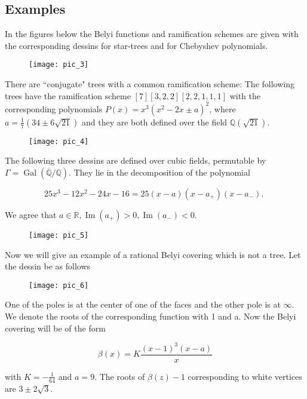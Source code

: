 \subsection{Examples}

\begin{example}
   In the figures below the Belyi functions and ramification schemes are given with the corresponding dessins for star-trees and for Chebyshev polynomials. 
\begin{figure}[htp]
\texttt{[image: pic\_3]}
\end{figure}
\end{example}


\begin{example}
There are ``conjugate" trees with a common ramification scheme: The following trees have the ramification scheme $[7][3,2,2][2,2,1,1,1]$ with the corresponding polynomials $P(x)=x^{3}\left(x^{2}-2 x \pm a\right)^{2}$, where $a=\frac{1}{7}(34 \pm 6 \sqrt{21})$ and they are both defined over the field $\mathbb{Q}(\sqrt{21})$.
\begin{figure}[htp]
\texttt{[image: pic\_4]}
\end{figure}
\end{example}


\begin{example}
    The following three dessins are defined over cubic fields, permutable by $\Gamma=\operatorname{Gal}(\overline{\mathbb{Q}} / \mathbb{Q})$. They lie in the decomposition of the polynomial

$$
25 x^{3}-12 x^{2}-24 x-16=25(x-a)\left(x-a_{+}\right)\left(x-a_{-}\right) \text {. }
$$

We agree that $a \in \mathbb{R}, \operatorname{Im}\left(a_{+}\right)>0, \operatorname{Im}\left(a_{-}\right)<0$.
\begin{figure}[htp]
\texttt{[image: pic\_5]}
\end{figure}
\hspace{0.1cm}

\end{example}




\begin{example}Now we will give an example of a rational Belyi covering which is not a tree.
  Let the dessin be as follows

\begin{figure}[htp]
\texttt{[image: pic\_6]}
\end{figure}

  One of the poles is at the center of one of the faces and the other pole is at $\infty$. We denote the roots of the corresponding function with 1 and a. Now the Belyi covering will be of the form

$$
\beta(x)=K \frac{(x-1)^{3}(x-a)}{x}
$$

with $K=-\frac{1}{64}$ and $a=9$. The roots of $\beta(z)-1$ corresponding to white vertices are $3 \pm 2 \sqrt{3}$.
\end{example}

